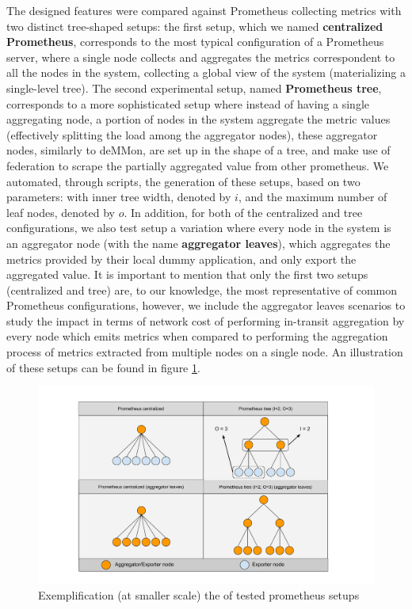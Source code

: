 The designed features were compared against Prometheus collecting metrics with two distinct tree-shaped setups: the first setup, which we named \textbf{centralized Prometheus}, corresponds to the most typical configuration of a Prometheus server, where a single node collects and aggregates the metrics correspondent to all the nodes in the system, collecting a global view of the system (materializing a single-level tree). The second experimental setup, named \textbf{Prometheus tree}, corresponds to a more sophisticated setup where instead of having a single aggregating node, a portion of nodes in the system aggregate the metric values (effectively splitting the load among the aggregator nodes), these aggregator nodes, similarly to deMMon, are set up in the shape of a tree, and make use of federation to scrape the partially aggregated value from other prometheus. We automated, through scripts, the generation of these setups, based on two parameters: with inner tree width, denoted by $i$, and the maximum number of leaf nodes, denoted by $o$. In addition, for both of the centralized and tree configurations, we also test setup a variation where every node in the system is an aggregator node (with the name \textbf{aggregator leaves}), which aggregates the metrics provided by their local dummy application, and only export the aggregated value. It is important to mention that only the first two setups (centralized and tree) are, to our knowledge, the most representative of common Prometheus configurations, however, we include the aggregator leaves scenarios to study the impact in terms of network cost of performing in-transit aggregation by every node which emits metrics when compared to performing the aggregation process of metrics extracted from multiple nodes on a single node. An illustration of these setups can be found in figure \ref{fig:sec:eval_prom_setups}.

\begin{figure}
    \centering
    \includegraphics[width=\linewidth]{Chapters/evaluation/figures/aggregation/Prometheus setups.pdf}
    \caption{Exemplification (at smaller scale) the of tested prometheus setups}
    \label{fig:sec:eval_prom_setups}
\end{figure}

